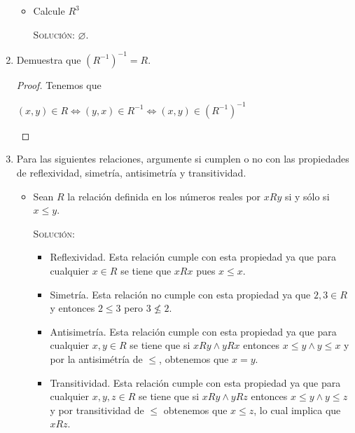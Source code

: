\documentclass[letterpaper,11pt]{article}
\begin{document}
\begin{enumerate}
\begin{itemize}
        \item Calcule $R^{3}$

        \textsc{Solución:} $\varnothing$.
    \end{itemize}

    \item Demuestra que $(R^{-1})^{-1} = R$.

    \begin{proof}
        Tenemos que 
        \begin{center}
            $(x, y) \in R ⇔ (y, x) \in R^{-1} ⇔ (x, y) \in (R^{-1})^{-1}$
        \end{center}
    \end{proof}

    \item Para las siguientes relaciones, argumente si cumplen o no con las 
    propiedades de reflexividad, simetría, antisimetría y transitividad.

    \begin{itemize}
        \item Sean $R$ la relación definida en los números reales por $xRy$
        si y sólo si $x \leq y$.

        \textsc{Solución:}
        \begin{itemize}
            \item Reflexividad. Esta relación cumple con esta propiedad ya que 
            para cualquier $x \in R$ se tiene que $xRx$ pues $x \leq x$.

            \item Simetría. Esta relación no cumple con esta propiedad ya que
            $2, 3 \in R$ y entonces $2 \leq 3$ pero $3 \not \leq 2$.

            \item Antisimetría. Esta relación cumple con esta propiedad ya que 
            para cualquier $x, y \in R$ se tiene que si $xRy \land yRx$ entonces 
            $x \leq y \land y \leq x$ y por la antisimétría de $\leq$, obtenemos 
            que $x = y$.

            \item Transitividad. Esta relación cumple con esta propiedad ya
            que para cualquier $x, y, z \in R$ se tiene que si $xRy \land yRz$
            entonces $x \leq y \land y \leq z$ y por transitividad de $\leq$
            obtenemos que $x \leq z$, lo cual implica que $xRz$. 
        \end{itemize}


\end{itemize}
\end{enumerate}
\end{document}
